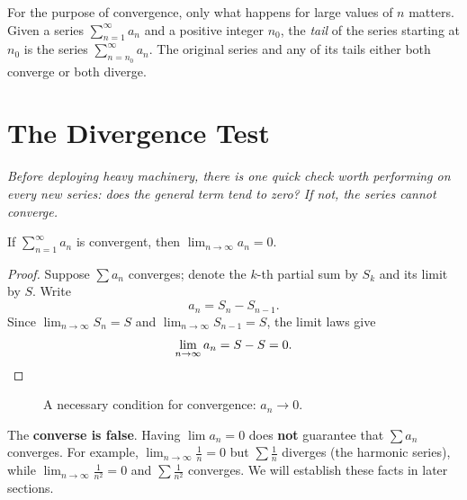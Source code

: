 \begin{definition}
\label{def:13-2}
For the purpose of convergence, only what happens for large values of $n$ matters.  Given a series $\sum_{n=1}^{\infty}a_{n}$ and a positive integer $n_{0}$, the \emph{tail} of the series starting at $n_{0}$ is the series $\sum_{n=n_{0}}^{\infty}a_{n}$.  The original series and any of its tails either both converge or both diverge.
\end{definition}

\section{The Divergence Test}
\label{sec:13.8}

\textit{Before deploying heavy machinery, there is one quick check worth performing on every new series: does the general term tend to zero?  If not, the series cannot converge.}

\begin{theorem}
\label{thm:13-5}
If $\displaystyle\sum_{n=1}^{\infty}a_{n}$ is convergent, then $\displaystyle\lim_{n\to\infty}a_{n}=0$.
\end{theorem}

\begin{proof}
Suppose $\sum a_{n}$ converges; denote the $k$-th partial sum by $S_{k}$ and its limit by $S$.  Write
\[
  a_{n} = S_{n} - S_{n-1}.
\]
Since $\lim_{n\to\infty}S_{n}=S$ and $\lim_{n\to\infty}S_{n-1}=S$, the limit laws give
\[
  \lim_{n\to\infty}a_{n} = S - S = 0. \qedhere
\]
\end{proof}

\begin{figure}[ht]
  \centering
  
  \caption{A necessary condition for convergence: $a_n\to 0$.}
  \label{fig:divergence-test}
\end{figure}

\begin{remark}[Warning]
The \textbf{converse is false}.  Having $\lim a_{n}=0$ does \textbf{not} guarantee that $\sum a_{n}$ converges.  For example, $\lim_{n\to\infty}\frac{1}{n}=0$ but $\sum\frac{1}{n}$ diverges (the harmonic series), while $\lim_{n\to\infty}\frac{1}{n^{2}}=0$ and $\sum\frac{1}{n^{2}}$ converges.  We will establish these facts in later sections.
\end{remark}

